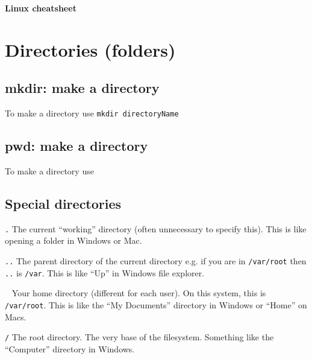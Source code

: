 \documentclass[12pt]{article}
\begin{document}
\begin{center}
\Large{\textbf{Linux cheatsheet}}\\
\end{center}

\section{Directories (folders)}

\subsection{mkdir: make a directory}
To make a directory use 
\texttt{mkdir directoryName}

\subsection{pwd: make a directory}
To make a directory use 

\subsection{Special directories}
\begin{definition}
\item[\texttt{.}] The current ``working'' directory (often unnecessary to specify this). This is like opening a folder in Windows or Mac.
\item[\texttt{..}] The parent directory of the current directory e.g. if you are in \texttt{/var/root} then \texttt{..} is \texttt{/var}. This is like ``Up'' in Windows file explorer.
\item[\texttt{~}] Your home directory (different for each user). On this system, this is \texttt{/var/root}. This is like the ``My Documents'' directory in Windows or ``Home'' on Macs.
\item[\texttt{/}] The root directory. The very base of the filesystem.  Something like the ``Computer'' directory in Windows.
\end{definition}
\end{document}
